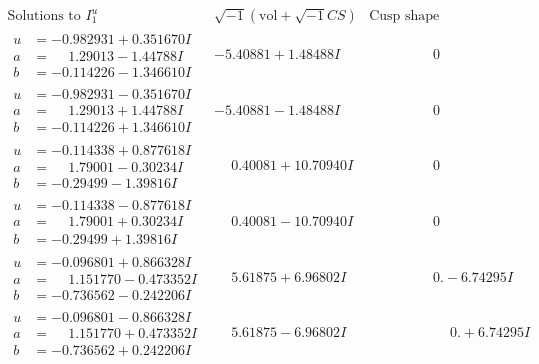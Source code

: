 \documentclass[1p]{elsarticle_modified}
\theoremstyle{definition}
\newcommand{\I}{\sqrt{-1}}
\begin{document}
$$\begin{array}{c|c|c}  
\text{Solutions to }I^u_{1}& \I (\text{vol} + \sqrt{-1}CS) & \text{Cusp shape}\\
 \hline 
\begin{aligned}
u &= -0.982931 + 0.351670 I \\
a &= \phantom{-}1.29013 - 1.44788 I \\
b &= -0.114226 - 1.346610 I\end{aligned}
 & -5.40881 + 1.48488 I & \phantom{-0.000000 } 0 \\ \hline\begin{aligned}
u &= -0.982931 - 0.351670 I \\
a &= \phantom{-}1.29013 + 1.44788 I \\
b &= -0.114226 + 1.346610 I\end{aligned}
 & -5.40881 - 1.48488 I & \phantom{-0.000000 } 0 \\ \hline\begin{aligned}
u &= -0.114338 + 0.877618 I \\
a &= \phantom{-}1.79001 - 0.30234 I \\
b &= -0.29499 - 1.39816 I\end{aligned}
 & \phantom{-}0.40081 + 10.70940 I & \phantom{-0.000000 } 0 \\ \hline\begin{aligned}
u &= -0.114338 - 0.877618 I \\
a &= \phantom{-}1.79001 + 0.30234 I \\
b &= -0.29499 + 1.39816 I\end{aligned}
 & \phantom{-}0.40081 - 10.70940 I & \phantom{-0.000000 } 0 \\ \hline\begin{aligned}
u &= -0.096801 + 0.866328 I \\
a &= \phantom{-}1.151770 - 0.473352 I \\
b &= -0.736562 - 0.242206 I\end{aligned}
 & \phantom{-}5.61875 + 6.96802 I & \phantom{-0.000000 } 0. - 6.74295 I \\ \hline\begin{aligned}
u &= -0.096801 - 0.866328 I \\
a &= \phantom{-}1.151770 + 0.473352 I \\
b &= -0.736562 + 0.242206 I\end{aligned}
 & \phantom{-}5.61875 - 6.96802 I & \phantom{-0.000000 -}0. + 6.74295 I \\ \hline\begin{aligned}

\end{aligned}
\end{array}$$
\end{document}
